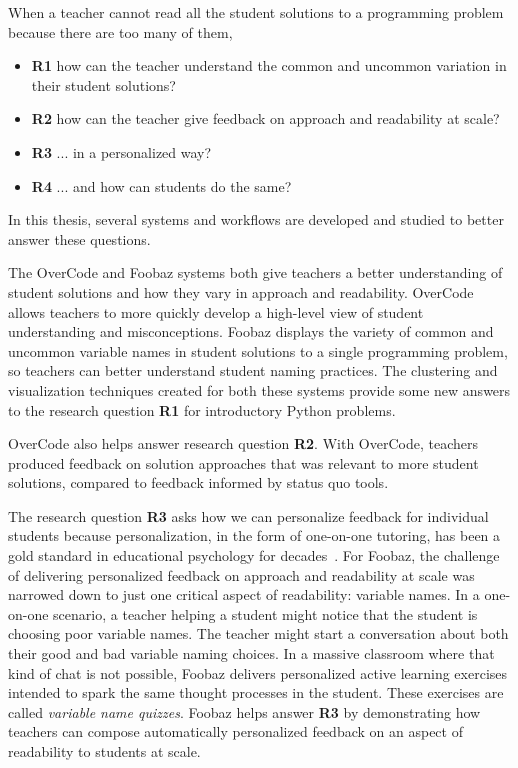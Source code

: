 When a teacher cannot read all the student solutions to a programming problem because there are too many of them,
\begin{itemize}
\item {\bf R1} how can the teacher understand the common and uncommon variation in their student solutions?
\item {\bf R2} how can the teacher give feedback on approach and readability at scale?
\item {\bf R3} ... in a personalized way?
\item {\bf R4} ... and how can students do the same?
\end{itemize}
In this thesis, several systems and workflows are developed and studied to better answer these questions. 

The OverCode and Foobaz systems both give teachers a better understanding of student solutions and how they vary in approach and readability. OverCode allows teachers to more quickly develop a high-level view of student understanding and misconceptions. Foobaz displays the variety of common and uncommon variable names in student solutions to a single programming problem, so teachers can better understand student naming practices. The clustering and visualization techniques created for both these systems provide some new answers to the research question {\bf R1} for introductory Python problems. 

OverCode also helps answer research question {\bf R2}. With OverCode, teachers produced feedback on solution approaches that was relevant to more student solutions, compared to feedback informed by status quo tools. 

The research question {\bf R3} asks how we can personalize feedback for individual students because personalization, in the form of one-on-one tutoring, has been a gold standard in educational psychology for decades~\cite{bloom}. For Foobaz, the challenge of delivering personalized feedback on approach and readability at scale was narrowed down to just one critical aspect of readability: variable names. In a one-on-one scenario, a teacher helping a student might notice that the student is choosing poor variable names. The teacher might start a conversation about both their good and bad variable naming choices. In a massive classroom where that kind of chat is not possible, Foobaz delivers personalized active learning exercises intended to spark the same thought processes in the student. These exercises are called {\it variable name quizzes}. Foobaz helps answer {\bf R3} by demonstrating how teachers can compose automatically personalized feedback on an aspect of readability to students at scale.

